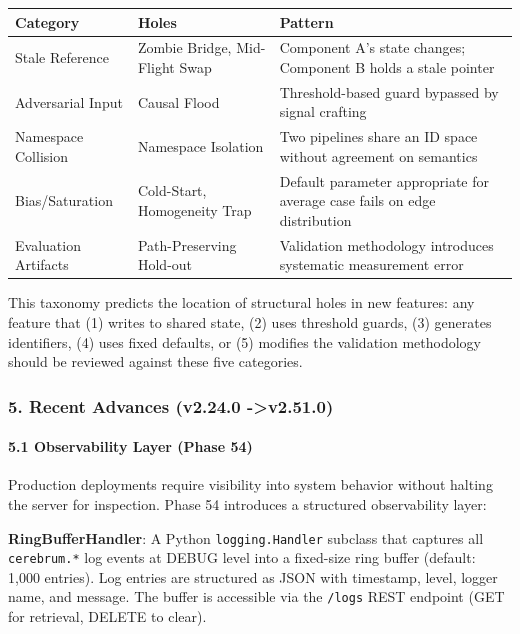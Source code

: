 \begin{center}
{\footnotesize
\begin{tabularx}{\columnwidth}{|>{\raggedright\arraybackslash}X|>{\raggedright\arraybackslash}X|>{\raggedright\arraybackslash}X|}
\hline
Category & Holes & Pattern \\ \hline
Stale Reference & Zombie Bridge, Mid-Flight Swap & Component A's state changes; Component B holds a stale pointer \\ \hline
Adversarial Input & Causal Flood & Threshold-based guard bypassed by signal crafting \\ \hline
Namespace Collision & Namespace Isolation & Two pipelines share an ID space without agreement on semantics \\ \hline
Bias/Saturation & Cold-Start, Homogeneity Trap & Default parameter appropriate for average case fails on edge distr\-ibution \\ \hline
Evaluation Artifacts & Path-Preserving Hold-out & Validation methodology introduces systematic measurement error \\ \hline
\end{tabularx}
}
\end{center}

This taxonomy predicts the location of structural holes in new features: any feature that (1) writes to shared state, (2) uses threshold guards, (3) generates identifiers, (4) uses fixed defaults, or (5) modifies the validation methodology should be reviewed against these five categories.

\subsubsection{5. Recent Advances (v2.24.0 -\textgreater  v2.51.0)}

\paragraph{5.1 Observ\-ability Layer (Phase 54)}
Production deployments require visibility into system behavior without halting the server for inspection. Phase 54 introduces a structured obser\-vability layer:

\textbf{RingBufferHandler}: A Python \texttt{logging.Handler} subclass that captures all \texttt{cerebrum.*} log events at DEBUG level into a fixed-size ring buffer (default: 1,000 entries). Log entries are structured as JSON with timestamp, level, logger name, and message. The buffer is accessible via the \texttt{/logs} REST endpoint (GET for retrieval, DELETE to clear).

